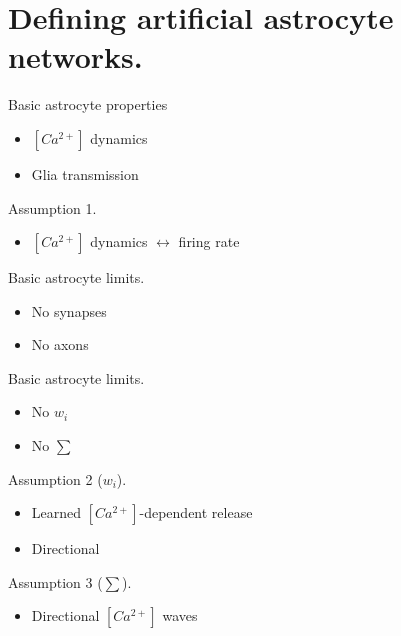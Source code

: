 \documentclass[10pt]{beamer}
\begin{document}
\section[AANs]{Defining artificial astrocyte networks.}

\begin{frame}[fragile]{Basic astrocyte properties}
\begin{itemize}
    \item $[Ca^{2+}]$ dynamics
    \item Glia transmission
\end{itemize}
\end{frame}

\begin{frame}[fragile]{Assumption 1.}
\begin{itemize}
    \item $[Ca^{2+}]$ dynamics $\leftrightarrow$ firing rate
\end{itemize}
\end{frame}

\begin{frame}[fragile]{Basic astrocyte limits.}
\begin{itemize}
    \item No synapses
    \item No axons 
\end{itemize}
\end{frame}

\begin{frame}[fragile]{Basic astrocyte limits.}
\begin{itemize}
    \item No $w_i$
    \item No $\sum$
\end{itemize}
\end{frame}

\begin{frame}[fragile]{Assumption 2 ($w_i$).}
\begin{itemize}
    \item Learned $[Ca^{2+}]$-dependent release
    \item Directional
\end{itemize}
\end{frame}
\begin{frame}[fragile]{Assumption 3 ($\sum$).}
\begin{itemize}
    \item Directional $[Ca^{2+}]$ waves
\end{itemize}
\end{frame}
\end{document}
